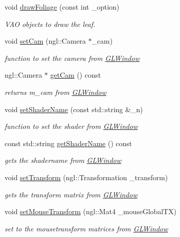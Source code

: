 \begin{DoxyCompactItemize}
void \hyperlink{classdrawPlant_a77c31c41c652dde8c520440aa60236c5}{drawFoliage} (const int \_\-option)
\begin{DoxyCompactList}\small\item\em VAO objects to draw the leaf. \item\end{DoxyCompactList}\item 
void \hyperlink{classdrawPlant_a0be5be0576dc4f79fad43d200f30c06e}{setCam} (ngl::Camera $\ast$\_\-cam)
\begin{DoxyCompactList}\small\item\em function to set the camera from \hyperlink{classGLWindow}{GLWindow} \item\end{DoxyCompactList}\item 
ngl::Camera $\ast$ \hyperlink{classdrawPlant_aa01cdf1dd30ce5485445976aecb30797}{getCam} () const 
\begin{DoxyCompactList}\small\item\em returns m\_\-cam from \hyperlink{classGLWindow}{GLWindow} \item\end{DoxyCompactList}\item 
void \hyperlink{classdrawPlant_a94a690f884d9c8694d339fc593b6ec05}{setShaderName} (const std::string \&\_\-n)
\begin{DoxyCompactList}\small\item\em function to set the shader from \hyperlink{classGLWindow}{GLWindow} \item\end{DoxyCompactList}\item 
const std::string \hyperlink{classdrawPlant_a510090864706457b3914fae0694608e7}{getShaderName} () const 
\begin{DoxyCompactList}\small\item\em gets the shadername from \hyperlink{classGLWindow}{GLWindow} \item\end{DoxyCompactList}\item 
void \hyperlink{classdrawPlant_a09fd9b02587d3bd6c9a3e5d358618cac}{setTransform} (ngl::Transformation \_\-transform)
\begin{DoxyCompactList}\small\item\em gets the transform matrix from \hyperlink{classGLWindow}{GLWindow} \item\end{DoxyCompactList}\item 
void \hyperlink{classdrawPlant_a823c40b052df2f569e1792990b99be53}{setMouseTransform} (ngl::Mat4 \_\-mouseGlobalTX)
\begin{DoxyCompactList}\small\item\em set to the mousetransform matrices from \hyperlink{classGLWindow}{GLWindow} \item\end{DoxyCompactList}\end{DoxyCompactItemize}
